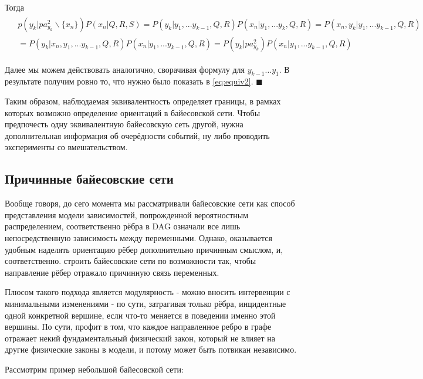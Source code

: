 \documentclass[fleqn]{article}
\begin{document}
Тогда \begin{align}
	\begin{split}
	&p(y_k|pa^2_{y_k} \backslash \{x_n\}) P(x_n | Q,R,S) = P(y_k|y_1,...y_{k-1},Q,R) P(x_n | y_1,...y_k,Q,R) = P(x_n, y_k | y_1,...y_{k-1}, Q, R) \\&= P(y_{k}|x_n,y_1,...y_{k-1}, Q, R)P(x_n|y_1,...y_{k-1},Q,R) = P(y_k|pa^2_{y_k})P(x_n|y_1,...y_{k-1},Q,R)
\end{split}
\end{align}

Далее мы можем действовать аналогично, сворачивая формулу для $y_{k-1}\ldots y_1$. В результате получим ровно то, что нужно было показать в \ref{eq:equiv2}.
$\blacksquare$

Таким образом, наблюдаемая эквивалентность определяет границы, в рамках которых возможно определение ориентаций в байесовской сети. Чтобы предпочесть одну эквивалентную байесовскую сеть другой, нужна дополнительная информация об очерёдности событий, ну либо проводить эксперименты со вмешательством.

\subsection*{Причинные байесовские сети}

Вообще говоря, до сего момента мы рассматривали байесовские сети как способ представления модели зависимостей, попрожденной вероятностным распределением, соответственно рёбра в DAG означали все лишь непосредственную зависимость между переменными. Однако, оказывается удобным наделять ориентацию рёбер дополнительно причинным смыслом, и, соответственно. строить байесовские сети по возможности так, чтобы направление рёбер отражало причинную связь переменных. 

Плюсом такого подхода является модулярность - можно вносить интервенции с минимальными изменениями - по сути, затрагивая только рёбра, инцидентные одной конкретной вершине, если что-то меняется в поведении именно этой вершины. По сути, профит в том, что каждое направленное ребро в графе отражает некий фундаментальный физический закон, который не влияет на другие физические законы в модели, и потому может быть потвикан независимо.

Рассмотрим пример небольшой байесовской сети:
\end{document}
